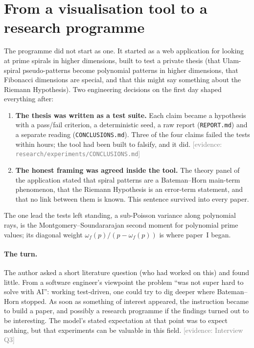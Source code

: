 \documentclass[11pt,a4paper]{article}
\newcommand{\evidence}[1]{{\footnotesize\textcolor{Gray}{[evidence: #1]}}}
\newcommand{\file}[1]{\texttt{#1}}
\begin{document}
\section{From a visualisation tool to a research programme}\label{sec:origin}

The programme did not start as one. It started as a web application for looking at prime spirals in higher
dimensions, built to test a private thesis (that Ulam-spiral pseudo-patterns become polynomial patterns in higher
dimensions, that Fibonacci dimensions are special, and that this might say something about the Riemann
Hypothesis). Two engineering decisions on the first day shaped everything after:
\begin{enumerate}[itemsep=1pt]
\item \textbf{The thesis was written as a test suite.} Each claim became a hypothesis with a pass/fail criterion,
  a deterministic seed, a raw report (\file{REPORT.md}) and a separate reading (\file{CONCLUSIONS.md}). Three of the
  four claims failed the tests within hours; the tool had been built to falsify, and it did.
  \evidence{\file{research/experiments/CONCLUSIONS.md}}
\item \textbf{The honest framing was agreed inside the tool.} The theory panel of the application stated that
  spiral patterns are a Bateman--Horn main-term phenomenon, that the Riemann Hypothesis is an error-term
  statement, and that no link between them is known. This sentence survived into every paper.
\end{enumerate}
The one lead the tests left standing, a sub-Poisson variance along polynomial rays, is the Montgomery--Soundararajan
second moment for polynomial prime values; its diagonal weight $\omega_f(p)/(p-\omega_f(p))$ is where paper~I began.
\paragraph{The turn.} The author asked a short literature question (who had worked on this) and found little.
From a software engineer's viewpoint the problem ``was not super hard to solve with AI'': working test-driven, one
could try to dig deeper where Bateman--Horn stopped. As soon as something of interest appeared, the instruction
became to build a paper, and possibly a research programme if the findings turned out to be interesting. The model's
stated expectation at that point was to expect nothing, but that experiments can be valuable in this field.
\evidence{Interview Q3}
\end{document}
